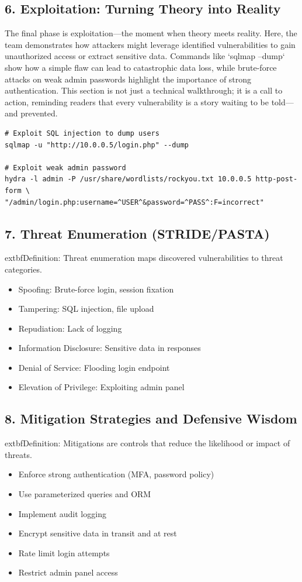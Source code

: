 \subsection*{6. Exploitation: Turning Theory into Reality}
The final phase is exploitation—the moment when theory meets reality. Here, the team demonstrates how attackers might leverage identified vulnerabilities to gain unauthorized access or extract sensitive data\cite{uceda2015}. Commands like `sqlmap --dump` show how a simple flaw can lead to catastrophic data loss, while brute-force attacks on weak admin passwords highlight the importance of strong authentication. This section is not just a technical walkthrough; it is a call to action, reminding readers that every vulnerability is a story waiting to be told—and prevented.
\begin{verbatim}
# Exploit SQL injection to dump users
sqlmap -u "http://10.0.0.5/login.php" --dump

# Exploit weak admin password
hydra -l admin -P /usr/share/wordlists/rockyou.txt 10.0.0.5 http-post-form \
"/admin/login.php:username=^USER^&password=^PASS^:F=incorrect"
\end{verbatim}

\subsection*{7. Threat Enumeration (STRIDE/PASTA)}
	extbf{Definition:} Threat enumeration maps discovered vulnerabilities to threat categories\cite{shostack2014,uceda2015}.
\begin{itemize}
	\item Spoofing: Brute-force login, session fixation
	\item Tampering: SQL injection, file upload
	\item Repudiation: Lack of logging
	\item Information Disclosure: Sensitive data in responses
	\item Denial of Service: Flooding login endpoint
	\item Elevation of Privilege: Exploiting admin panel
\end{itemize}

\subsection*{8. Mitigation Strategies and Defensive Wisdom}
	extbf{Definition:} Mitigations are controls that reduce the likelihood or impact of threats\cite{owasp}.
\begin{itemize}
	\item Enforce strong authentication (MFA, password policy)
	\item Use parameterized queries and ORM
	\item Implement audit logging
	\item Encrypt sensitive data in transit and at rest
	\item Rate limit login attempts
	\item Restrict admin panel access
\end{itemize}

